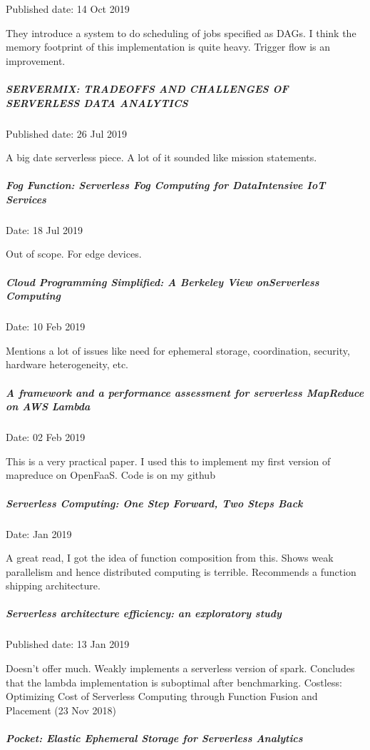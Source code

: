 \documentclass[12pt,titlepage]{article}
\begin{document}
Published date: 14 Oct 2019

They introduce a system to do scheduling of jobs specified as DAGs. I think the memory footprint of this implementation is quite heavy. Trigger flow is an improvement.

\subparagraph{SERVERMIX: TRADEOFFS AND CHALLENGES OF SERVERLESS DATA ANALYTICS}
\label{sec:orgb02cbc5}

Published date: 26 Jul 2019

A big date serverless piece. A lot of it sounded like mission statements. 

\subparagraph{Fog Function: Serverless Fog Computing for DataIntensive IoT Services}
\label{sec:org8c706cd}

Date: 18 Jul 2019

Out of scope. For edge devices.

\subparagraph{Cloud Programming Simplified: A Berkeley View onServerless Computing}
\label{sec:orgffb6379}

Date: 10 Feb 2019

Mentions a lot of issues like need for ephemeral storage, coordination, security, hardware heterogeneity, etc. 

\subparagraph{A framework and a performance assessment for serverless MapReduce on AWS Lambda}
\label{sec:orgcdf09f5}

Date: 02 Feb 2019

This is a very practical paper. I used this to implement my first version of mapreduce on OpenFaaS. Code is on my github

\subparagraph{Serverless Computing: One Step Forward, Two Steps Back}
\label{sec:org9e6cd88}

Date: Jan 2019

A great read, I got the idea of function composition from this.
Shows weak parallelism and hence distributed computing is terrible.
Recommends a function shipping architecture.

\subparagraph{Serverless architecture efficiency: an exploratory study}
\label{sec:org7357bcb}

Published date: 13 Jan 2019

Doesn’t offer much. Weakly implements a serverless version of spark.
Concludes that the lambda implementation is suboptimal after benchmarking.
Costless: Optimizing Cost of Serverless Computing through Function Fusion and Placement (23 Nov 2018)

\subparagraph{Pocket: Elastic Ephemeral Storage for Serverless Analytics}
\label{sec:orgc92e608}
\end{document}
